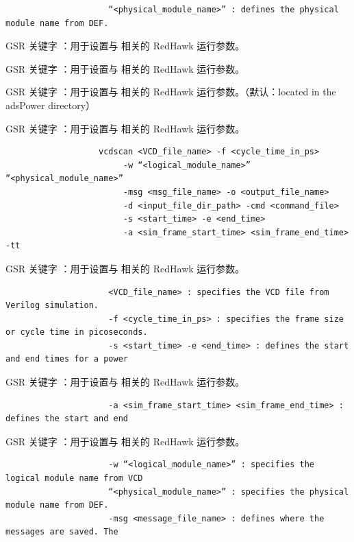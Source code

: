 \begin{lstlisting}
                     “<physical_module_name>” : defines the physical module name from DEF.
\end{lstlisting}

GSR 关键字 ：用于设置与  相关的 RedHawk 运行参数。

GSR 关键字 ：用于设置与  相关的 RedHawk 运行参数。

GSR 关键字 ：用于设置与  相关的 RedHawk 运行参数。（默认：located in the adsPower directory）

GSR 关键字 ：用于设置与  相关的 RedHawk 运行参数。

\begin{lstlisting}
                   vcdscan <VCD_file_name> -f <cycle_time_in_ps>
                        -w “<logical_module_name>” “<physical_module_name>”
                        -msg <msg_file_name> -o <output_file_name>
                        -d <input_file_dir_path> -cmd <command_file>
                        -s <start_time> -e <end_time>
                        -a <sim_frame_start_time> <sim_frame_end_time> -tt
\end{lstlisting}

GSR 关键字 ：用于设置与  相关的 RedHawk 运行参数。

\begin{lstlisting}
                     <VCD_file_name> : specifies the VCD file from Verilog simulation.
                     -f <cycle_time_in_ps> : specifies the frame size or cycle time in picoseconds.
                     -s <start_time> -e <end_time> : defines the start and end times for a power
\end{lstlisting}

GSR 关键字 ：用于设置与  相关的 RedHawk 运行参数。

\begin{lstlisting}
                     -a <sim_frame_start_time> <sim_frame_end_time> : defines the start and end
\end{lstlisting}

GSR 关键字 ：用于设置与  相关的 RedHawk 运行参数。

\begin{lstlisting}
                     -w “<logical_module_name>” : specifies the logical module name from VCD
                     “<physical_module_name>” : specifies the physical module name from DEF.
                     -msg <message_file_name> : defines where the messages are saved. The
\end{lstlisting}

